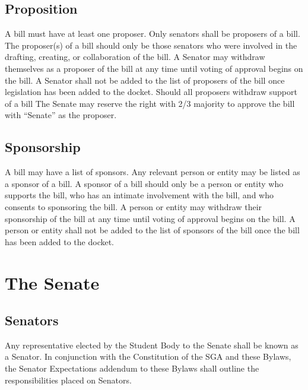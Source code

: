\documentclass[12pt]{scrreprt}
\begin{document}
\section{Proposition}
A bill must have at least one proposer. Only senators shall be proposers of a bill. The proposer(s) of a bill should only be those senators who were involved in the drafting, creating, or collaboration of the bill. A Senator may withdraw themselves as a proposer of the bill at any time until voting of approval begins on the bill. A Senator shall not be added to the list of proposers of the bill once legislation has been added to the docket. Should all proposers withdraw support of a bill The Senate may reserve the right with 2/3 majority to approve the bill with “Senate” as the proposer.

\section{Sponsorship}
A bill may have a list of sponsors. Any relevant person or entity may be listed as a sponsor of a bill. A sponsor of a bill should only be a person or entity who supports the bill, who has an intimate involvement with the bill, and who consents to sponsoring the bill. A person or entity may withdraw their sponsorship of the bill at any time until voting of approval begins on the bill. A person or entity shall not be added to the list of sponsors of the bill once the bill has been added to the docket.


\chapter{The Senate}

\section{Senators}
Any representative elected by the Student Body to the Senate shall be known as 
a Senator. In conjunction with the Constitution of the SGA and these Bylaws, the Senator Expectations addendum to these Bylaws shall outline the responsibilities placed on Senators.
\end{document}
